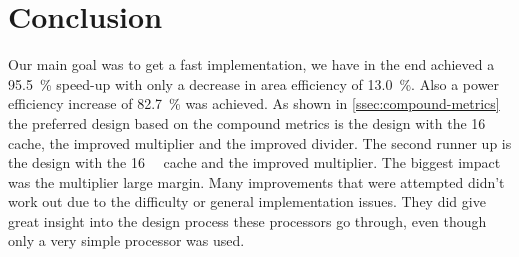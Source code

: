 \documentclass[final]{article}
\begin{document}
\section{Conclusion}
\label{sec:conclusion}
Our main goal was to get a fast implementation, we have in the end achieved a \SI{95.5}{\percent} speed-up with only a decrease in area efficiency of \SI{13.0}{\percent}.
Also a power efficiency increase of \SI{82.7}{\percent} was achieved.
As shown in \cref{ssec:compound-metrics} the preferred design based on the compound metrics is the design with the \SI{16}{\kibi\byte} cache, the improved multiplier and the improved divider.
The second runner up is the design with the \SI{16}{\kibi\byte} cache and the improved multiplier.
The biggest impact was the multiplier large margin.
Many improvements that were attempted didn't work out due to the difficulty or general implementation issues.
They did give great insight into the design process these processors go through, even though only a very simple processor was used.
\end{document}
